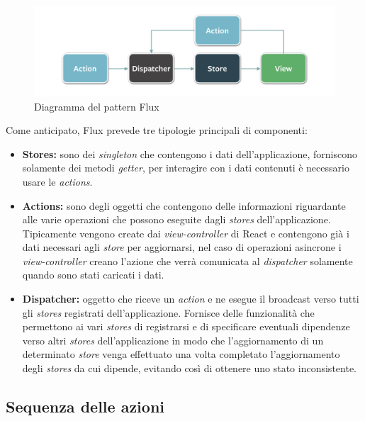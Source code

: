 \begin{figure}[htp]
\centering
\includegraphics[width=\textwidth*3/4]{../immagini/flux-simple}
\caption{Diagramma del pattern Flux}  
\end{figure}
\FloatBarrier

Come anticipato, Flux prevede tre tipologie principali di componenti:
\begin{itemize}
\item \textbf{Stores:} sono dei \textit{singleton} che contengono i dati dell'applicazione, forniscono solamente dei metodi \textit{getter}, per interagire con i dati contenuti è necessario usare le \textit{actions}.
\item \textbf{Actions:} sono degli oggetti che contengono delle informazioni riguardante alle varie operazioni che possono eseguite dagli \textit{stores} dell'applicazione. Tipicamente vengono create dai \textit{view-controller} di React e contengono già i dati necessari agli \textit{store} per aggiornarsi, nel caso di operazioni asincrone i \textit{view-controller} creano l'azione che verrà comunicata al \textit{dispatcher} solamente quando sono stati caricati i dati.
\item \textbf{Dispatcher:} oggetto che riceve un \textit{action} e ne esegue il broadcast verso tutti gli \textit{stores} registrati dell'applicazione. Fornisce delle funzionalità che permettono ai vari \textit{stores} di registrarsi e di specificare eventuali dipendenze verso altri \textit{stores} dell'applicazione in modo che l'aggiornamento di un determinato \textit{store} venga effettuato una volta completato l'aggiornamento degli \textit{stores} da cui dipende, evitando così di ottenere uno stato inconsistente.
\end{itemize}


\subsection{Sequenza delle azioni}

